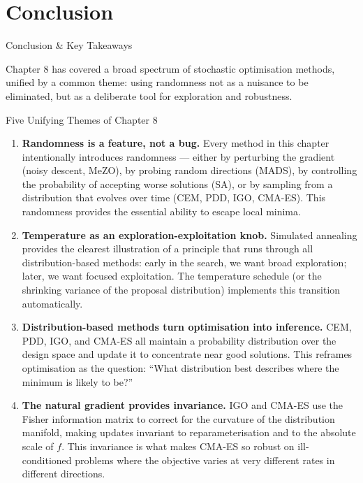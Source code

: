 \documentclass[aspectratio=169,10pt]{beamer}
\begin{document}
\section{Conclusion}

\begin{frame}[allowframebreaks]{Conclusion \& Key Takeaways}

Chapter 8 has covered a broad spectrum of stochastic optimisation methods, unified by a common theme: using randomness not as a nuisance to be eliminated, but as a deliberate tool for exploration and robustness.

\begin{block}{Five Unifying Themes of Chapter 8}
\begin{enumerate}
  \item \textbf{Randomness is a feature, not a bug.} Every method in this chapter intentionally introduces randomness --- either by perturbing the gradient (noisy descent, MeZO), by probing random directions (MADS), by controlling the probability of accepting worse solutions (SA), or by sampling from a distribution that evolves over time (CEM, PDD, IGO, CMA-ES). This randomness provides the essential ability to escape local minima.

  \item \textbf{Temperature as an exploration-exploitation knob.} Simulated annealing provides the clearest illustration of a principle that runs through all distribution-based methods: early in the search, we want broad exploration; later, we want focused exploitation. The temperature schedule (or the shrinking variance of the proposal distribution) implements this transition automatically.

  \item \textbf{Distribution-based methods turn optimisation into inference.} CEM, PDD, IGO, and CMA-ES all maintain a probability distribution over the design space and update it to concentrate near good solutions. This reframes optimisation as the question: ``What distribution best describes where the minimum is likely to be?''

  \item \textbf{The natural gradient provides invariance.} IGO and CMA-ES use the Fisher information matrix to correct for the curvature of the distribution manifold, making updates invariant to reparameterisation and to the absolute scale of $f$. This invariance is what makes CMA-ES so robust on ill-conditioned problems where the objective varies at very different rates in different directions.


\end{enumerate}
\end{block}
\end{frame}
\end{document}
